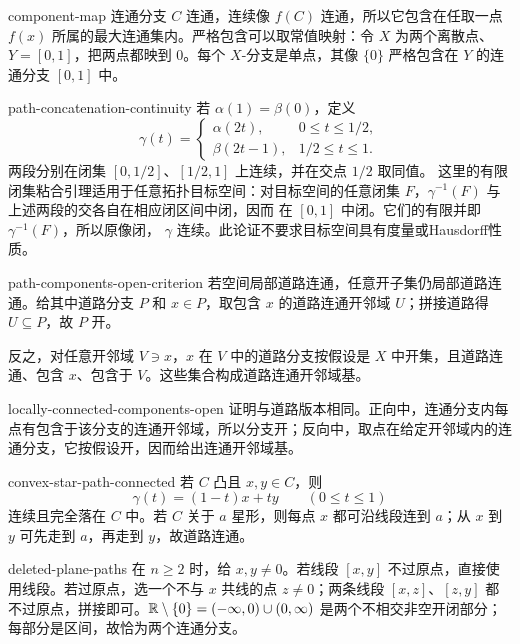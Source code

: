 \begin{solution}{component-map}
连通分支 \(C\) 连通，连续像 \(f(C)\) 连通，所以它包含在任取一点 \(f(x)\) 所属的最大连通集内。严格包含可以取常值映射：令 \(X\) 为两个离散点、\(Y=[0,1]\)，把两点都映到 \(0\)。每个 \(X\)-分支是单点，其像 \(\{0\}\) 严格包含在 \(Y\) 的连通分支 \([0,1]\) 中。
\end{solution}

\begin{solution}{path-concatenation-continuity}
若 \(\alpha(1)=\beta(0)\)，定义
\[
 \gamma(t)=
 \begin{cases}
  \alpha(2t),&0\le t\le1/2,\\
  \beta(2t-1),&1/2\le t\le1.
 \end{cases}
\]
两段分别在闭集 \([0,1/2]\)、\([1/2,1]\) 上连续，并在交点 \(1/2\) 取同值。
这里的有限闭集粘合引理适用于任意拓扑目标空间：对目标空间的任意闭集
\(F\)，\(\gamma^{-1}(F)\) 与上述两段的交各自在相应闭区间中闭，因而
在 \([0,1]\) 中闭。它们的有限并即 \(\gamma^{-1}(F)\)，所以原像闭，
\(\gamma\) 连续。此论证不要求目标空间具有度量或Hausdorff性质。
\end{solution}

\begin{solution}{path-components-open-criterion}
若空间局部道路连通，任意开子集仍局部道路连通。给其中道路分支 \(P\) 和 \(x\in P\)，取包含 \(x\) 的道路连通开邻域 \(U\)；拼接道路得 \(U\subseteq P\)，故 \(P\) 开。

反之，对任意开邻域 \(V\ni x\)，\(x\) 在 \(V\) 中的道路分支按假设是 \(X\) 中开集，且道路连通、包含 \(x\)、包含于 \(V\)。这些集合构成道路连通开邻域基。
\end{solution}

\begin{solution}{locally-connected-components-open}
证明与道路版本相同。正向中，连通分支内每点有包含于该分支的连通开邻域，所以分支开；反向中，取点在给定开邻域内的连通分支，它按假设开，因而给出连通开邻域基。
\end{solution}

\begin{solution}{convex-star-path-connected}
若 \(C\) 凸且 \(x,y\in C\)，则
\[
 \gamma(t)=(1-t)x+ty\qquad(0\le t\le1)
\]
连续且完全落在 \(C\) 中。若 \(C\) 关于 \(a\) 星形，则每点 \(x\) 都可沿线段连到 \(a\)；从 \(x\) 到 \(y\) 可先走到 \(a\)，再走到 \(y\)，故道路连通。
\end{solution}

\begin{solution}{deleted-plane-paths}
在 \(n\ge2\) 时，给 \(x,y\ne0\)。若线段 \([x,y]\) 不过原点，直接使用线段。若过原点，选一个不与 \(x\) 共线的点 \(z\ne0\)；两条线段 \([x,z]\)、\([z,y]\) 都不过原点，拼接即可。\(\mathbb{R}\setminus\{0\}=(-\infty,0)\cup(0,\infty)\) 是两个不相交非空开闭部分；每部分是区间，故恰为两个连通分支。
\end{solution}

